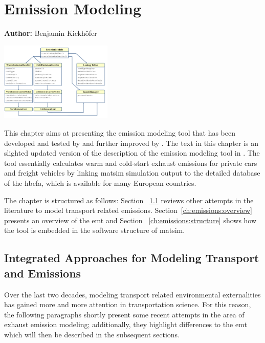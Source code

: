 \chapter{Emission Modeling}
\label{ch:emissions}

\hfill \textbf{Author:} Benjamin Kickh\"ofer

\begin{center} \includegraphics[width=0.4\textwidth, angle=0]{extending/figures/emissionToolOverview_pdfa.pdf} \end{center}

This chapter aims at presenting the emission modeling tool that has been developed and tested by \citet{HuelsmannEtAl_LAS_2011} and further improved by \citet{KickhoeferEtAl_VanoutriveVerhetsel_2013}. The text in this chapter is an slighted updated version of the description of the emission modeling tool in \citet{Kickhoefer_PhDThesis_2014}.
%
The tool essentially calculates warm and cold-start exhaust emissions for private cars and freight vehicles by linking \gls{matsim} simulation output to the detailed database of the \gls{hbefa}, which is available for many European countries.

The chapter is structured as follows:
%
Section ~\ref{ch:emissions:relatedWork} reviews other attempts in the literature to model transport related emissions. Section~\ref{ch:emissions:overview} presents an overview of the \gls{emt} and Section ~\ref{ch:emissions:structure} shows how the tool is embedded in the software structure of \gls{matsim}.

\section{Integrated Approaches for Modeling Transport and Emissions}
\label{ch:emissions:relatedWork}
%
%
Over the last two decades, modeling transport related environmental 
externalities has gained more and more attention in transportation science.
%
For this reason, the following paragraphs shortly present some recent 
attempts in the area of exhaust emission modeling; additionally, they 
highlight differences to the \gls{emt} which will then be described in the 
subsequent sections.

